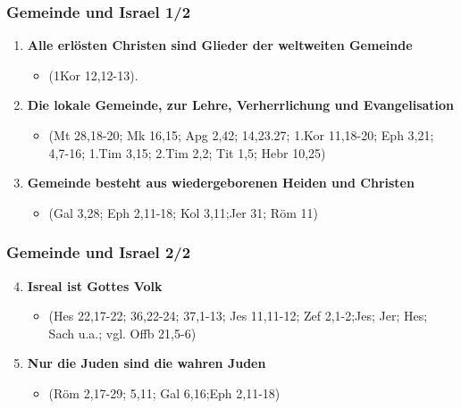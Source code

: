 \documentclass[aspectratio=43]{beamer}
\begin{document}
\begin{frame}
    \frametitle{Gemeinde und Israel 1/2}  %
    \vspace{0.80cm}    
    \begin{enumerate}
        \item \textbf{Alle erlösten Christen sind Glieder der weltweiten Gemeinde}
            \begin{itemize}              
                \item (1Kor 12,12-13).               
            \end{itemize}            
            \vspace{0.2cm}          
        \item \textbf{Die lokale Gemeinde, zur Lehre, Verherrlichung und Evangelisation}
            \begin{itemize}
                \item (Mt 28,18-20; Mk 16,15; Apg 2,42; 14,23.27; 1.Kor 11,18-20; Eph 3,21; 4,7-16; 1.Tim 3,15; 2.Tim 2,2; Tit 1,5; Hebr 10,25)
            \end{itemize}            
            \vspace{0.2cm}
        \item \textbf{Gemeinde besteht aus wiedergeborenen Heiden und Christen}
            \begin{itemize}
                \item  (Gal 3,28; Eph 2,11-18; Kol 3,11;Jer 31; Röm 11)
            \end{itemize} 
            \vspace{0.2cm}
            \end{enumerate}   
    \end{frame}
    \begin{frame}
        \frametitle{Gemeinde und Israel 2/2}  %
        \vspace{0.80cm}    
        \begin{enumerate}
            \setcounter{enumi}{3}
            \item \textbf{Isreal ist Gottes Volk}        
                \begin{itemize}
                    \item (Hes 22,17-22; 36,22-24; 37,1-13; Jes 11,11-12; Zef 2,1-2;Jes; Jer; Hes; Sach u.a.; vgl. Offb 21,5-6)                
                \end{itemize} 
                \vspace{0.2cm}
            \item \textbf{Nur die Juden sind die wahren Juden}
                \begin{itemize}
                    \item (Röm 2,17-29; 5,11; Gal 6,16;Eph 2,11-18)              
                \end{itemize} 
        \end{enumerate}   
    \end{frame}
\end{document}
